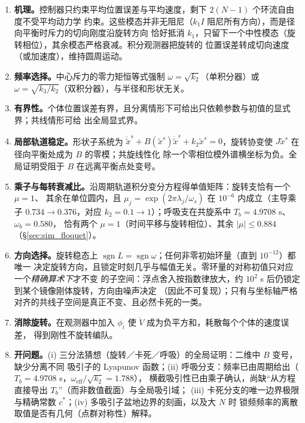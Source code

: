 \documentclass[11pt,a4paper]{ctexart}
\theoremstyle{plain}
\theoremstyle{definition}
\theoremstyle{remark}
\newcommand{\ts}{\tilde{x}^{s}}
\DeclareMathOperator{\sgn}{sgn}
\begin{document}
\begin{enumerate}[leftmargin=2.2em]
  \item \textbf{机理。}控制器只约束平均位置误差与平均速度，剩下 $2(N-1)$ 个环流自由度不受平均动力学
        约束。这些模态并非无阻尼（$k_1I$ 阻尼所有方向），而是径向平衡时斥力的切向刚度沿旋转方向
        恰好抵消 $k_1$，只留下一个中性模态（旋转相位），其余模态严格衰减。积分观测器把旋转的
        位置误差转成切向速度（或加速度），维持圆周运动。
  \item \textbf{频率选择。}中心斥力的零力矩恒等式强制 $\omega=\sqrt{k_2}$（单积分器）或
        $\omega=\sqrt{k_3/k_2}$（双积分器），与半径和形状无关。
  \item \textbf{有界性。}个体位置误差有界，且分离情形下可给出只依赖参数与初值的显式界；共线情形可给
        出全局显式界。
  \item \textbf{局部轨道稳定。}形状子系统为
        $\ddot\ts+B(\ts)\dot\ts+k_2\ts=0$，旋转协变使 $J\ts$ 在径向平衡处成为 $B$ 的零模；共旋线性化
        除一个零相位模外谱横坐标为负。全局证明受阻于 $B$ 在远离平衡点处变号。
  \item \textbf{乘子与每转衰减比。}沿周期轨道积分变分方程得单值矩阵：旋转支恰有一个 $\mu=1$、
        其余在单位圆内，且 $\mu_j=\exp(2\pi\lambda_j/\omega_s)$ 在 $10^{-6}$ 内成立（主导乘子
        $0.734\to0.376$，对应 $k_2=0.1\to1$）；呼吸支在共旋系中 $T_b=4.9708$ s、$\omega_b=0.580$，
        恰有两个 $\mu=1$（时间平移与旋转相位）、其余 $|\mu|\le0.884$（\S\ref{sec:sim_floquet}）。
  \item \textbf{方向选择。}旋转稳态上 $\sgn L=\sgn\omega$；任何非零初始环量（直到 $10^{-12}$）都唯一
        决定旋转方向，且锁定时刻几乎与幅值无关。零环量的对称初值只对应一个\emph{精确算术下}才不变
        的子空间：浮点舍入按指数律放大，约 $10^2$ s 后仍锁定到某个镜像刚体旋转，方向由噪声决定
        （因此不可复现）；只有与坐标轴严格对齐的共线子空间是真正不变、且必然卡死的一类。
  \item \textbf{消除旋转。}在观测器中加入 $\phi_i$ 使 $\dot V$ 成为负平方和，耗散每个个体的速度误差，
        得到刚性不旋转编队。
  \item \textbf{开问题。}(i) 三分法猜想（旋转／卡死／呼吸）的全局证明：二维中 $B$ 变号，缺少分离不同
        吸引子的 Lyapunov 函数；(ii) 呼吸分支：频率已由周期给出（$T_b=4.9708$ s，$\omega_{\text{eff}}/\sqrt{k_2}=1.788$），
        横截吸引性已由乘子确认，尚缺“从方程直接导出 $T_b$”（而非数值截面）与全局吸引域；
        (iii) 卡死分支的唯一边界极限与精确常数 $c^*$；(iv) 多吸引子盆地边界的刻画，以及大 $N$ 时
        锁频频率的离散取值是否有几何（点群对称性）解释。
\end{enumerate}
\end{document}
